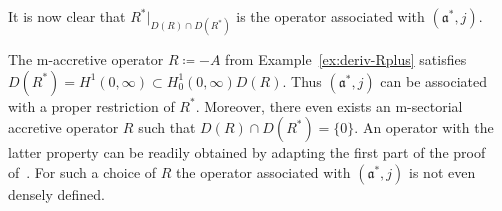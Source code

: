 \documentclass[a4paper,oneside,12pt]{amsart}
\theoremstyle{plain}
\theoremstyle{definition}
\newenvironment{example}
{\pushQED{\qed}

\examplex}
{\popQED\endexamplex}
\begin{document}
\begin{example}
It is now clear that ${\ensuremath{{R^*}|_{{D(R)\cap D(R^*)}}}}$ is the operator associated with $({{\mathfrak{{a}}}}^*,j)$.

The {\ensuremath{\text{m}}}-accretive operator $R\coloneqq -A$ from Example~\ref{ex:deriv-Rplus} satisfies $D(R^*)={\ensuremath{{H^1(0,\infty)}}}\subset {\ensuremath{{H^1_0(0,\infty)}}}D(R)$.
Thus $({{\mathfrak{{a}}}}^*,j)$ can be associated with a proper restriction of $R^*$.
Moreover, there even exists an {\ensuremath{\text{m}}}-sectorial accretive operator $R$ such that $D(R)\cap D(R^*)=\{0\}$.
An operator with the latter property can be readily obtained
by adapting the first part of the proof of~\cite[Theorem~3.6]{FW71:op-rg}.
For such a choice of $R$ the operator associated with $({{\mathfrak{{a}}}}^*,j)$ is not even densely defined.
\end{example}
\end{document}
